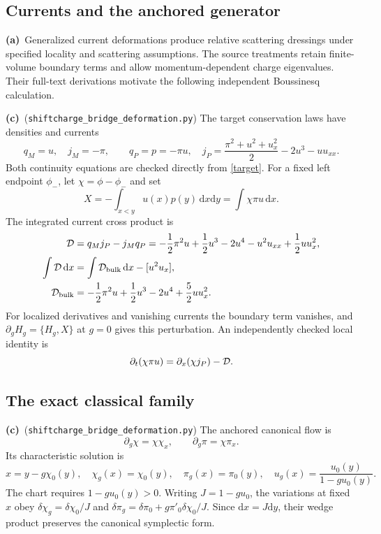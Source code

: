 \documentclass[11pt,a4paper]{article}
\newcommand{\A}{\textbf{(a)}\ }
\newcommand{\C}{\textbf{(c)}\ }
\newcommand{\dd}{\mathrm d}
\newcommand{\file}[1]{\nolinkurl{#1}}
\newcommand{\df}{\file{shiftcharge_bridge_deformation.py}}
\begin{document}
\subsection{Currents and the anchored generator}
\A Generalized current deformations produce relative scattering dressings
under specified locality and scattering assumptions. The source treatments
retain finite-volume boundary terms and allow momentum-dependent charge
eigenvalues. Their full-text derivations motivate the following independent
Boussinesq calculation. \cite{DDY,CD}

\C (\df) The target conservation laws have densities and currents
\begin{equation}
 q_M=u,\quad j_M=-\pi,\qquad
 q_P=p=-\pi u,\quad
 j_P=\frac{\pi^2+u^2+u_x^2}{2}-2u^3-u u_{xx}.
 \label{currents}
\end{equation}
Both continuity equations are checked directly from \eqref{target}.
For a fixed left endpoint $\phi_-$, let $\chi=\phi-\phi_-$ and set
\begin{equation}
 X=-\int_{x<y}u(x)p(y)\,\dd x\dd y
   =\int\chi\pi u\,\dd x .
 \label{generator}
\end{equation}
The integrated current cross product is
\begin{align}
 {\cal D}&=q_Mj_P-j_Mq_P
 =-\frac12\pi^2u+\frac12u^3-2u^4-u^2u_{xx}+\frac12u u_x^2,\nonumber\\
 \int{\cal D}\,\dd x
 &=\int{\cal D}_{\rm bulk}\,\dd x-[u^2u_x],\nonumber\\
 {\cal D}_{\rm bulk}
 &=-\frac12\pi^2u+\frac12u^3-2u^4+\frac52u u_x^2 .
 \label{deformation-density}
\end{align}
For localized derivatives and vanishing currents the boundary term vanishes,
and $\partial_gH_g=\{H_g,X\}$ at $g=0$ gives this perturbation.
An independently checked local identity is
\begin{equation}
 \partial_t(\chi\pi u)=\partial_x(\chi j_P)-{\cal D}.
 \label{local-generator}
\end{equation}

\subsection{The exact classical family}
\C (\df) The anchored canonical flow is
\begin{equation}
 \partial_g\chi=\chi\chi_x,\qquad
 \partial_g\pi=\chi\pi_x.
\end{equation}
Its characteristic solution is
\begin{equation}
 x=y-g\chi_0(y),\quad
 \chi_g(x)=\chi_0(y),\quad
 \pi_g(x)=\pi_0(y),\quad
 u_g(x)=\frac{u_0(y)}{1-gu_0(y)} .
 \label{reciprocal}
\end{equation}
The chart requires $1-gu_0(y)>0$.
Writing $J=1-gu_0$, the variations at fixed $x$ obey
$\delta\chi_g=\delta\chi_0/J$ and
$\delta\pi_g=\delta\pi_0+g\pi'_0\delta\chi_0/J$.
Since $\dd x=J\dd y$, their wedge product preserves the canonical
symplectic form.
\end{document}
